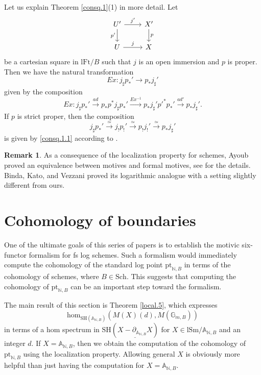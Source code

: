 \documentclass[10pt]{amsart}
\theoremstyle{definition}
\newtheorem{rmk}[thm]{Remark}
\theoremstyle{remark}
\numberwithin{equation}{subsection}
\newcommand{\A}{\mathbb{A}}
\newcommand{\G}{\mathbb{G}}
\newcommand{\N}{\mathbb{N}}
\newcommand{\ul}{\underline}
\newcommand{\pt}{\mathrm{pt}}
\newcommand{\SH}{\mathrm{SH}}
\newcommand{\map}{\mathrm{hom}}
\newcommand{\Sch}{\mathrm{Sch}}
\newcommand{\lSm}{\mathrm{lSm}}
\newcommand{\lFt}{\mathrm{lFt}}
\begin{document}
Let us explain Theorem \ref{consq.1}(1) in more detail.
Let
\[
\begin{tikzcd}
U'\ar[r,"j'"]\ar[d,"p'"']&
X'\ar[d,"p"]
\\
U\ar[r,"j"]&
X
\end{tikzcd}
\]
be a cartesian square in $\lFt/B$ such that $j$ is an open immersion and $p$ is proper.
Then we have the natural transformation
\begin{equation}
\label{consq.1.1}
Ex\colon j_\sharp p_*' \to p_*j_\sharp'
\end{equation}
given by the composition
\[
Ex\colon j_\sharp p_*'
\xrightarrow{ad}
p_*p^*j_\sharp p_*'
\xrightarrow{Ex^{-1}}
p_*j_\sharp' p'^* p_*'
\xrightarrow{ad'}
p_*j_\sharp'.
\]
If $p$ is strict proper, then the composition
\[
j_\sharp p_*' \xrightarrow{\simeq} j_!p_!'\xrightarrow{\simeq} p_!j_!' \xrightarrow{\simeq} p_*j_\sharp'
\]
is given by \eqref{consq.1.1} according to \cite[\S 2.2.a]{CD19}.

\begin{rmk}
As a consequence of the localization property for schemes,
Ayoub proved an equivalence between motives and formal motives,
see \cite[Corollaire 1.4.29]{MR3381140} for the details.
Binda, Kato, and Vezzani \cite[Theorem 2.2]{2207.00369} proved its logarithmic analogue with a setting slightly different from ours.
\end{rmk}




\section{Cohomology of boundaries}



One of the ultimate goals of this series of papers is to establish the motivic six-functor formalism for fs log schemes.
Such a formalism would immediately compute the cohomology of the standard log point $\pt_{\N,B}$ in terms of the cohomology of schemes,
where $B\in \Sch$.
This suggests that computing the cohomology of $\pt_{\N,B}$ can be an important step toward the formalism.


The main result of this section is Theorem \ref{local.5}, which expresses
\begin{equation}
\label{boundary.0.1}
\map_{\SH(\A_{\N,B})}
(M(X)(d),M(\G_{m,B}))
\end{equation}
in terms of a hom spectrum in $\SH(\ul{X-\partial_{\A_{\N,B}}X})$ for $X\in \lSm/\A_{\N,B}$ and an integer $d$.
If $X=\A_{\N,B}$, then we obtain the computation of the cohomology of $\pt_{\N,B}$ using the localization property.
Allowing general $X$ is obviously more helpful than just having the computation for $X=\A_{\N,B}$.
\end{document}
